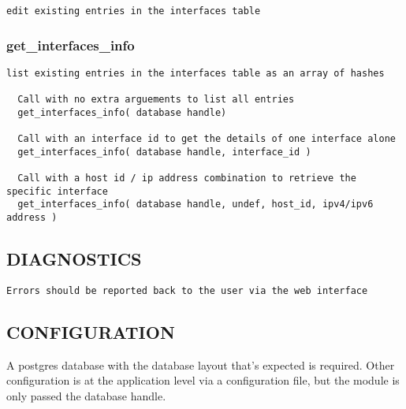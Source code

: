 \documentclass{book}
\begin{document}
\begin{Verbatim}[fontfamily=courier,gobble=1,frame=lines,fontsize=\small]
  edit existing entries in the interfaces table
\end{Verbatim}


\subsubsection{get\protect\_interfaces\protect\_info}
\label{Inventory::Interfaces_get_interfaces_info}
\hypertarget{Inventory::Interfaces_get_interfaces_info}{}


\begin{Verbatim}[fontfamily=courier,gobble=1,frame=lines,fontsize=\footnotesize]
  list existing entries in the interfaces table as an array of hashes

  Call with no extra arguements to list all entries
  get_interfaces_info( database handle)

  Call with an interface id to get the details of one interface alone
  get_interfaces_info( database handle, interface_id )

  Call with a host id / ip address combination to retrieve the specific interface
  get_interfaces_info( database handle, undef, host_id, ipv4/ipv6 address )
\end{Verbatim}


\subsection{DIAGNOSTICS}
\label{Inventory::Interfaces_DIAGNOSTICS}
\hypertarget{Inventory::Interfaces_DIAGNOSTICS}{}


\begin{Verbatim}[fontfamily=courier,gobble=1,frame=lines,fontsize=\small]
  Errors should be reported back to the user via the web interface
\end{Verbatim}


\subsection{CONFIGURATION}
\label{Inventory::Interfaces_CONFIGURATION}
\hypertarget{Inventory::Interfaces_CONFIGURATION}{}



A postgres database with the database layout that's expected is required. Other configuration is at the application level via a configuration file, but the module is only passed the database handle.
\end{document}
